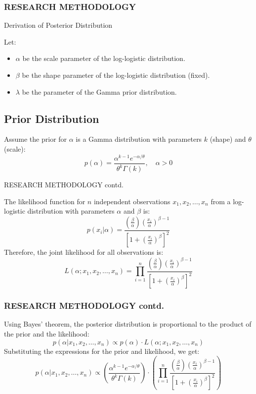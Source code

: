 \documentclass{beamer}
\begin{document}
\begin{frame}
\frametitle{\textbf{RESEARCH METHODOLOGY}}

Derivation of Posterior Distribution

Let:
\begin{itemize}
    \item $\alpha$ be the scale parameter of the log-logistic distribution.
    \item $\beta$ be the shape parameter of the log-logistic distribution (fixed).
    \item $\lambda$ be the parameter of the Gamma prior distribution.
\end{itemize}

\subsection*{Prior Distribution}

Assume the prior for $\alpha$ is a Gamma distribution with parameters $k$ (shape) and $\theta$ (scale):
\[
p(\alpha) = \frac{\alpha^{k-1} e^{-\alpha/\theta}}{\theta^k \Gamma(k)}, \quad \alpha > 0
\]


\end{frame}


\begin{frame}{RESEARCH METHODOLOGY contd.}



The likelihood function for $n$ independent observations $x_1, x_2, \ldots, x_n$ from a log-logistic distribution with parameters $\alpha$ and $\beta$ is:
\[
p(x_i | \alpha) = \frac{\left(\frac{\beta}{\alpha}\right) \left(\frac{x_i}{\alpha}\right)^{\beta-1}}{\left[1 + \left(\frac{x_i}{\alpha}\right)^{\beta}\right]^2}
\]
Therefore, the joint likelihood for all observations is:
\[
L(\alpha; x_1, x_2, \ldots, x_n) = \prod_{i=1}^{n} \frac{\left(\frac{\beta}{\alpha}\right) \left(\frac{x_i}{\alpha}\right)^{\beta-1}}{\left[1 + \left(\frac{x_i}{\alpha}\right)^{\beta}\right]^2}
\]




\end{frame}



\begin{frame}

\frametitle{RESEARCH METHODOLOGY contd.}
Using Bayes' theorem, the posterior distribution is proportional to the product of the prior and the likelihood:
\[
p(\alpha | x_1, x_2, \ldots, x_n) \propto p(\alpha) \cdot L(\alpha; x_1, x_2, \ldots, x_n)
\]
Substituting the expressions for the prior and likelihood, we get:
\[
p(\alpha | x_1, x_2, \ldots, x_n) \propto \left( \frac{\alpha^{k-1} e^{-\alpha/\theta}}{\theta^k \Gamma(k)} \right) \cdot \left( \prod_{i=1}^{n} \frac{\left(\frac{\beta}{\alpha}\right) \left(\frac{x_i}{\alpha}\right)^{\beta-1}}{\left[1 + \left(\frac{x_i}{\alpha}\right)^{\beta}\right]^2} \right)
\]


\end{frame}
\end{document}
